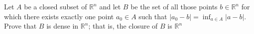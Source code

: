 Let $A$ be a closed subset of $\mathbb{R}^{n}$ and let $B$ be the set of all those points $b \in \mathbb{R}^{n}$ for which there exists exactly one point $a_{0}\in A $ such that $|a_{0}-b|= \inf_{a\in A}|a-b|$.
Prove that $B$ is dense in $\mathbb{R}^{n}$;  that is, the closure of $B$ is $\mathbb{R}^{n}$